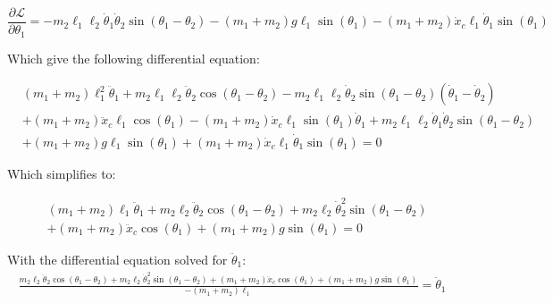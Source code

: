 \documentclass[10pt]{article}
\begin{document}
    
    \begin{equation} \label{eq: lagrange Step3}
        \frac{\partial \mathcal{L}}{\partial\theta_1} =
        -m_2\ell_1\ell_2\dot\theta_1\dot\theta_2\sin(\theta_1-\theta_2) 
        - (m_1 + m_2)g\ell_1\sin(\theta_1)
        -(m_1 +m_2)\dot x_c\ell_1\dot\theta_1\sin(\theta_1)
    \end{equation}

    Which give the following differential equation:

    \begin{equation}
        \begin{aligned}
            &(m_1 + m_2)\ell_1^2\ddot\theta_1   +   m_2\ell_1\ell_2\ddot\theta_2\cos(\theta_1 - \theta_2)  -m_2\ell_1\ell_2\dot\theta_2\sin(\theta_1-\theta_2)(\dot\theta_1 - \dot\theta_2)\\
            &+   (m_1 + m_2)\ddot x_c\ell_1\cos(\theta_1) - (m_1 + m_2) \dot x_c\ell_1\sin(\theta_1)\dot\theta_1 + m_2\ell_1\ell_2\dot\theta_1\dot\theta_2\sin(\theta_1-\theta_2) \\ 
            & + (m_1 + m_2)g\ell_1\sin(\theta_1) + (m_1 + m_2)\dot x_c\ell_1\dot\theta_1\sin(\theta_1) = 0
        \end{aligned}
    \end{equation}   


    Which simplifies to:

    \begin{equation}
        \begin{aligned}
            &(m_1 + m_2)\ell_1\ddot\theta_1   +   m_2\ell_2\ddot\theta_2\cos(\theta_1 - \theta_2)  +  m_2\ell_2\dot\theta_2^2\sin(\theta_1-\theta_2)\\
            &+   (m_1 + m_2)\ddot x_c\cos(\theta_1) + (m_1 + m_2)g\sin(\theta_1) = 0
        \end{aligned}
    \end{equation}  

    With the differential equation solved for $\ddot \theta_1$:
    \begin{equation}
        \begin{aligned}
            \frac{m_2\ell_2\ddot\theta_2\cos(\theta_1 - \theta_2)  +m_2\ell_2\dot\theta_2^2\sin(\theta_1-\theta_2)
            +   (m_1 + m_2)\ddot x_c\cos(\theta_1) + (m_1 + m_2)g\sin(\theta_1)}{-(m_1 + m_2)\ell_1} = \ddot \theta_1
        \end{aligned}
    \end{equation}  
    
\end{document}
